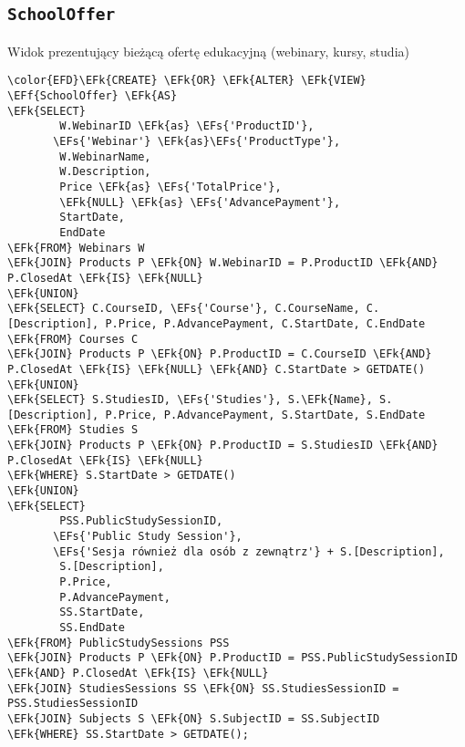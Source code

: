 \documentclass[11pt]{article}
\newcommand{\EFs}[1]{\textcolor{EFs}{#1}} %
\newcommand{\EFk}[1]{\textcolor{EFk}{\textbf{#1}}} %
\newcommand{\EFf}[1]{\textcolor{EFf}{#1}} %
\begin{document}
\subsection{\texttt{SchoolOffer}}
\label{sec:orgd71e163}
Widok prezentujący bieżącą ofertę edukacyjną (webinary, kursy, studia)
\begin{Code}
\begin{Verbatim}
\color{EFD}\EFk{CREATE} \EFk{OR} \EFk{ALTER} \EFk{VIEW} \EFf{SchoolOffer} \EFk{AS}
\EFk{SELECT} 
        W.WebinarID \EFk{as} \EFs{'ProductID'},
       \EFs{'Webinar'} \EFk{as}\EFs{'ProductType'},
        W.WebinarName,
        W.Description,
        Price \EFk{as} \EFs{'TotalPrice'},
        \EFk{NULL} \EFk{as} \EFs{'AdvancePayment'},
        StartDate,
        EndDate
\EFk{FROM} Webinars W 
\EFk{JOIN} Products P \EFk{ON} W.WebinarID = P.ProductID \EFk{AND} P.ClosedAt \EFk{IS} \EFk{NULL}
\EFk{UNION}
\EFk{SELECT} C.CourseID, \EFs{'Course'}, C.CourseName, C.[Description], P.Price, P.AdvancePayment, C.StartDate, C.EndDate
\EFk{FROM} Courses C 
\EFk{JOIN} Products P \EFk{ON} P.ProductID = C.CourseID \EFk{AND} P.ClosedAt \EFk{IS} \EFk{NULL} \EFk{AND} C.StartDate > GETDATE()
\EFk{UNION}
\EFk{SELECT} S.StudiesID, \EFs{'Studies'}, S.\EFk{Name}, S.[Description], P.Price, P.AdvancePayment, S.StartDate, S.EndDate
\EFk{FROM} Studies S
\EFk{JOIN} Products P \EFk{ON} P.ProductID = S.StudiesID \EFk{AND} P.ClosedAt \EFk{IS} \EFk{NULL}
\EFk{WHERE} S.StartDate > GETDATE()
\EFk{UNION}
\EFk{SELECT} 
        PSS.PublicStudySessionID,
       \EFs{'Public Study Session'},
       \EFs{'Sesja również dla osób z zewnątrz'} + S.[Description],
        S.[Description],
        P.Price, 
        P.AdvancePayment,
        SS.StartDate,
        SS.EndDate
\EFk{FROM} PublicStudySessions PSS 
\EFk{JOIN} Products P \EFk{ON} P.ProductID = PSS.PublicStudySessionID \EFk{AND} P.ClosedAt \EFk{IS} \EFk{NULL}
\EFk{JOIN} StudiesSessions SS \EFk{ON} SS.StudiesSessionID = PSS.StudiesSessionID
\EFk{JOIN} Subjects S \EFk{ON} S.SubjectID = SS.SubjectID
\EFk{WHERE} SS.StartDate > GETDATE();
\end{Verbatim}
\end{Code}
\end{document}
